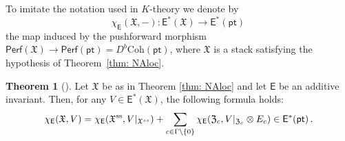 \documentclass[12pt]{amsart}
\theoremstyle{definition}
\newtheorem{theorem}[definition]{Theorem}
\newcommand{\sE}{\mathsf{E}}
\newcommand{\CO}{{\mathcal O}}
\newcommand{\1}{\mathbf 1}
\newcommand{\FX}{{\mathfrak{X}}}
\newcommand{\FZ}{{\mathfrak{Z}}}
\newcommand{\pt}{{\mathsf{pt}}}
\newcommand{\Coh}{\mathrm{Coh}}
\newcommand{\Perf}{\mathsf{Perf}}
\begin{document}
To imitate the notation used in $K$-theory we denote by
\[\chi_\sE(\FX, -)\colon \sE^\ast(\FX)\to \sE^\ast(\pt)\,\]
the map induced by the pushforward morphism $\Perf(\FX)\to \Perf(\pt)=D^b\Coh(\pt)$, where 
$\FX$ is a stack satisfying the hypothesis of Theorem~\ref{thm: NAloc}.


\begin{theorem}[{\cite{HLNAL}}]Let $\FX$ be as in Theorem \ref{thm: NAloc} and let $\sE$ be an additive invariant. Then, for any $V \in \sE^\ast(\FX)$, the following formula holds:
\begin{equation}\label{eq: NAlocE}\chi_\sE(\FX, V) = \chi_\sE(\mathcal \FX^{\textup{ss}}, V|_{\mathcal \FX^{ss}}) + \sum_{c\in \Gamma\setminus \{0\}} \chi_\sE(\FZ_{c}, V|_{\FZ_{c}} \otimes E_{c})\in \sE^\ast(\pt)\,.\end{equation}
\end{theorem}
\end{document}
